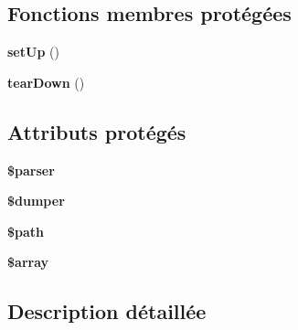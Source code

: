 \subsection*{Fonctions membres protégées}
\begin{DoxyCompactItemize}
\item 
{\bfseries set\+Up} ()\hypertarget{class_symfony_1_1_component_1_1_yaml_1_1_tests_1_1_dumper_test_a0bc688732d2b3b162ffebaf7812e78da}{}\label{class_symfony_1_1_component_1_1_yaml_1_1_tests_1_1_dumper_test_a0bc688732d2b3b162ffebaf7812e78da}

\item 
{\bfseries tear\+Down} ()\hypertarget{class_symfony_1_1_component_1_1_yaml_1_1_tests_1_1_dumper_test_a80fe3d17e658907fc75346a0ec9d6fc7}{}\label{class_symfony_1_1_component_1_1_yaml_1_1_tests_1_1_dumper_test_a80fe3d17e658907fc75346a0ec9d6fc7}

\end{DoxyCompactItemize}
\subsection*{Attributs protégés}
\begin{DoxyCompactItemize}
\item 
{\bfseries \$parser}\hypertarget{class_symfony_1_1_component_1_1_yaml_1_1_tests_1_1_dumper_test_a147a766daa03d52576c7345fea31c945}{}\label{class_symfony_1_1_component_1_1_yaml_1_1_tests_1_1_dumper_test_a147a766daa03d52576c7345fea31c945}

\item 
{\bfseries \$dumper}\hypertarget{class_symfony_1_1_component_1_1_yaml_1_1_tests_1_1_dumper_test_a6b5e16ac66fbfbc3d002d97555af1920}{}\label{class_symfony_1_1_component_1_1_yaml_1_1_tests_1_1_dumper_test_a6b5e16ac66fbfbc3d002d97555af1920}

\item 
{\bfseries \$path}\hypertarget{class_symfony_1_1_component_1_1_yaml_1_1_tests_1_1_dumper_test_a0a4baf0b22973c07685c3981f0d17fc4}{}\label{class_symfony_1_1_component_1_1_yaml_1_1_tests_1_1_dumper_test_a0a4baf0b22973c07685c3981f0d17fc4}

\item 
{\bfseries \$array}
\end{DoxyCompactItemize}


\subsection{Description détaillée}


